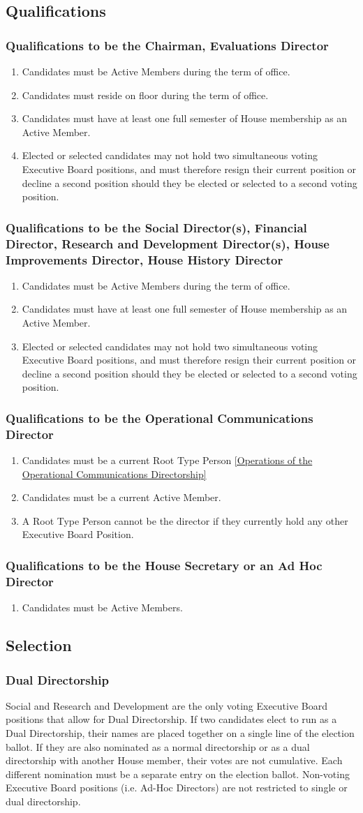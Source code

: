 \documentclass{article}
\newcommand{\asection}[1]{\subsection{#1} \label{#1}}
\newcommand{\asubsection}[1]{\subsubsection{#1} \label{#1}}
\begin{document}
\asection{Qualifications}
\asubsection{Qualifications to be the Chairman, Evaluations Director}
\begin{enumerate}
	\item Candidates must be Active Members during the term of office.
	\item Candidates must reside on floor during the term of office.
	\item Candidates must have at least one full semester of House membership as an Active Member.
	\item Elected or selected candidates may not hold two simultaneous voting Executive Board positions, and must therefore resign their current position or decline a second position should they be elected or selected to a second voting position.
\end{enumerate}
\asubsection{Qualifications to be the Social Director(s), Financial Director, Research and Development Director(s), House Improvements Director, House History Director}
\begin{enumerate}
	\item Candidates must be Active Members during the term of office.
	\item Candidates must have at least one full semester of House membership as an Active Member.
	\item Elected or selected candidates may not hold two simultaneous voting Executive Board positions, and must therefore resign their current position or decline a second position should they be elected or selected to a second voting position.
\end{enumerate}
\asubsection{Qualifications to be the Operational Communications Director}
\begin{enumerate}
	\item Candidates must be a current Root Type Person \ref{Operations of the Operational Communications Directorship}
	\item Candidates must be a current Active Member.
	\item A Root Type Person cannot be the director if they currently hold any other Executive Board Position.
\end{enumerate}

\asubsection{Qualifications to be the House Secretary or an Ad Hoc Director}
\begin{enumerate}
\item
 Candidates must be Active Members.
\end{enumerate}

\asection{Selection}
\asubsection{Dual Directorship}
Social and Research and Development are the only voting Executive Board positions that allow for Dual Directorship. If two candidates elect to run as a Dual Directorship, their names are placed together on a single line of the election ballot. If they are also nominated as a normal directorship or as a dual directorship with another House member, their votes are not cumulative. Each different nomination must be a separate entry on the election ballot. 
Non-voting Executive Board positions (i.e. Ad-Hoc Directors) are not restricted to single or dual directorship.
\end{document}

